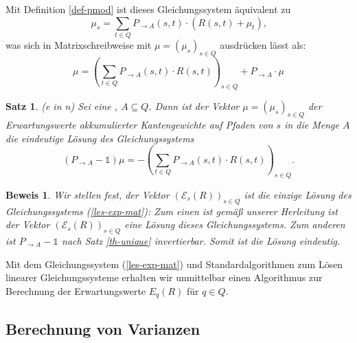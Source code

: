 \documentclass[a4paper]{article}
\newtheorem{satz}{Satz}[section] %
\theoremstyle{nonumberplain}
\newtheorem{beweis}{Beweis}
\begin{document}
Mit Definition \ref{def-pmod} ist dieses Gleichungssystem äquivalent zu
\begin{equation}
	\mu_s = \sum_{t \in Q}{ P_{\rightarrow A}(s,t) \cdot \left(R(s,t) + \mu_{t} \right) }\text{,}
\end{equation}
was sich in Matrixschreibweise mit $\mu = (\mu_s)_{s \in Q }$ ausdrücken lässt als:
\begin{equation}
\mu = \left(\sum_{t \in Q}{ P_{\rightarrow A}(s,t) \cdot R(s,t) }\right)_{s \in Q} + P_{\rightarrow A} \cdot \mu 
\end{equation}
\begin{satz}(\expect{}e in \mc{}n)
	Sei \mcex{} eine \mc{}, $A\subseteq Q$. Dann ist der Vektor $\mu = (\mu_s)_{s \in Q }$ der Erwartungswerte akkumulierter Kantengewichte auf Pfaden von $s$ in die Menge $A$ die eindeutige Lösung des Gleichungssystems	
	 \begin{equation}
	 (P_{\rightarrow A} - \mathbb{1}) \mu = - \left(\sum_{t \in Q}{ P_{\rightarrow A}(s,t) \cdot R(s,t) }\right)_{s \in Q}\text{.}\label{les-exp-mat}
	 \end{equation}
\end{satz}
\begin{beweis}
Wir stellen fest, der Vektor $(\mathcal{E}_{s}(R))_{s \in Q}$ ist die einzige Lösung des Gleichungssystems (\ref{les-exp-mat}):
Zum einen ist gemäß unserer Herleitung ist der Vektor $(\mathcal{E}_{s}(R))_{s \in Q}$ eine Lösung dieses Gleichungssystems. Zum anderen ist $P_{\rightarrow A} - \mathbb{1}$ nach Satz \ref{th-unique} invertierbar. Somit ist die Lösung eindeutig.
\end{beweis}

Mit dem Gleichungssystem (\ref{les-exp-mat}) und Standardalgorithmen zum Lösen linearer Gleichungssysteme erhalten wir unmittelbar einen Algorithmus zur Berechnung der Erwartungswerte $E_q(R)$ für $q \in Q$.

\subsection{Berechnung von Varianzen}
\end{document}
